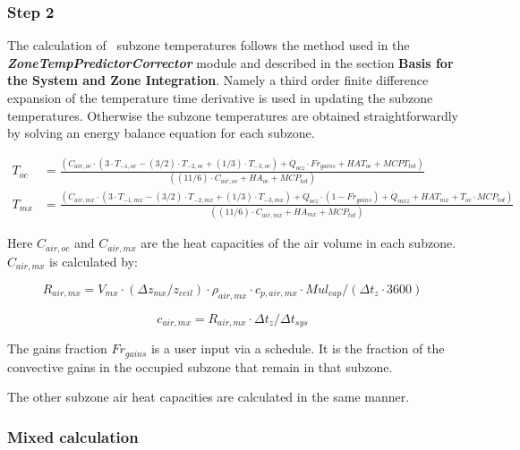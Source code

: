 {\subsubsection{Step 2}\label{step-2}

The calculation of~ subzone temperatures follows the method used in the \textbf{\emph{ZoneTempPredictorCorrector}} module and described in the section \textbf{Basis for the System and Zone Integration}. Namely a third order finite difference expansion of the temperature time derivative is used in updating the subzone temperatures. Otherwise the subzone temperatures are obtained straightforwardly by solving an energy balance equation for each subzone.

\begin{equation}
  \begin{array}{cl}
    T_{oc} & = \frac{(C_{air,oc} \cdot (3 \cdot T_{ - 1,oc} - (3/2) \cdot T_{ - 2,oc} + (1/3) \cdot T_{ - 3,oc}) + \dot Q_{ocz} \cdot Fr_{gains} + HAT_{oc} + MCPT_{tot})} {((11/6) \cdot C_{air,oc} + HA_{oc} + MCP_{tot})} \\
    T_{mx} & = \frac{(C_{air,mx} \cdot (3 \cdot T_{ - 1,mx} - (3/2) \cdot T_{ - 2,mx} + (1/3) \cdot T_{ - 3,mx}) + \dot Q_{ocz} \cdot (1 - Fr_{gains}) + \dot Q_{mxz} + HAT_{mx} + T_{oc} \cdot MCP_{tot})} {((11/6) \cdot C_{air,mx} + HA_{mx} + MCP_{tot})}
  \end{array}
\end{equation}

Here \({C_{air,oc}}\) and \({C_{air,mx}}\) are the heat capacities of the air volume in each subzone. \({C_{air,mx}}\) is calculated by:

\begin{equation}
{R_{air,mx}} = {V_{mx}} \cdot \left( {\Delta {z_{mx}}/{z_{ceil}}} \right) \cdot {\rho_{air,mx}} \cdot {c_{p,air,mx}} \cdot Mu{l_{cap}}/\left( {\Delta {t_z} \cdot 3600} \right)
\end{equation}

\begin{equation}
{c_{air,mx}} = {R_{air,mx}} \cdot \Delta {t_z}/\Delta {t_{sys}}
\end{equation}

The gains fraction \(F{r_{gains}}\) is a user input via a schedule. It is the fraction of the convective gains in the occupied subzone that remain in that subzone.

The other subzone air heat capacities are calculated in the same manner.

\subsubsection{Mixed calculation}\label{mixed-calculation-1}

}

